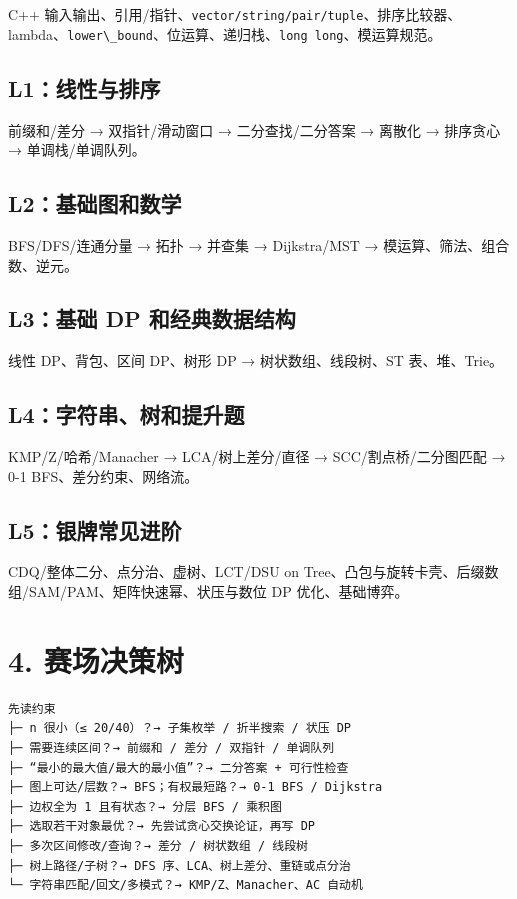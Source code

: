 C++ 输入输出、引用/指针、\passthrough{\lstinline!vector/string/pair/tuple!}、排序比较器、lambda、\passthrough{\lstinline!lower\_bound!}、位运算、递归栈、\passthrough{\lstinline!long long!}、模运算规范。

\subsection{L1：线性与排序}\label{l1ux7ebfux6027ux4e0eux6392ux5e8f}

前缀和/差分 → 双指针/滑动窗口 → 二分查找/二分答案 → 离散化 → 排序贪心 → 单调栈/单调队列。

\subsection{L2：基础图和数学}\label{l2ux57faux7840ux56feux548cux6570ux5b66}

BFS/DFS/连通分量 → 拓扑 → 并查集 → Dijkstra/MST → 模运算、筛法、组合数、逆元。

\subsection{L3：基础 DP 和经典数据结构}\label{l3ux57faux7840-dp-ux548cux7ecfux5178ux6570ux636eux7ed3ux6784}

线性 DP、背包、区间 DP、树形 DP → 树状数组、线段树、ST 表、堆、Trie。

\subsection{L4：字符串、树和提升题}\label{l4ux5b57ux7b26ux4e32ux6811ux548cux63d0ux5347ux9898}

KMP/Z/哈希/Manacher → LCA/树上差分/直径 → SCC/割点桥/二分图匹配 → 0-1 BFS、差分约束、网络流。

\subsection{L5：银牌常见进阶}\label{l5ux94f6ux724cux5e38ux89c1ux8fdbux9636}

CDQ/整体二分、点分治、虚树、LCT/DSU on Tree、凸包与旋转卡壳、后缀数组/SAM/PAM、矩阵快速幂、状压与数位 DP 优化、基础博弈。

\section{4. 赛场决策树}\label{ux8d5bux573aux51b3ux7b56ux6811}

\begin{lstlisting}
先读约束
├─ n 很小（≤ 20/40）？→ 子集枚举 / 折半搜索 / 状压 DP
├─ 需要连续区间？→ 前缀和 / 差分 / 双指针 / 单调队列
├─ “最小的最大值/最大的最小值”？→ 二分答案 + 可行性检查
├─ 图上可达/层数？→ BFS；有权最短路？→ 0-1 BFS / Dijkstra
├─ 边权全为 1 且有状态？→ 分层 BFS / 乘积图
├─ 选取若干对象最优？→ 先尝试贪心交换论证，再写 DP
├─ 多次区间修改/查询？→ 差分 / 树状数组 / 线段树
├─ 树上路径/子树？→ DFS 序、LCA、树上差分、重链或点分治
└─ 字符串匹配/回文/多模式？→ KMP/Z、Manacher、AC 自动机
\end{lstlisting}

